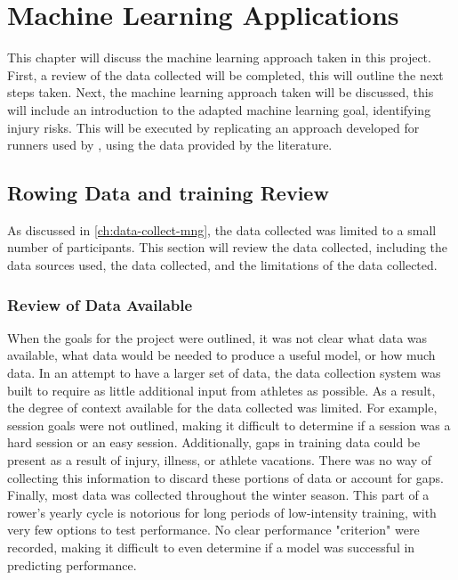 \chapter{\label{ch:ml}Machine Learning Applications}
This chapter will discuss the machine learning approach taken in this project. First, a review of the data collected will be completed, this will outline the next steps taken. Next, the machine learning approach taken will be discussed, this will include an introduction to the adapted machine learning goal, identifying injury risks. This will be executed by replicating an approach developed for runners used by \textcite{Lovdal2021}, using the data provided by the literature.

\section{Rowing Data and training Review}
As discussed in \autoref{ch:data-collect-mng}, the data collected was limited to a small number of participants. This section will review the data collected, including the data sources used, the data collected, and the limitations of the data collected.
\subsection{Review of Data Available}
When the goals for the project were outlined, it was not clear what data was available, what data would be needed to produce a useful model, or how much data. In an attempt to have a larger set of data, the data collection system was built to require as little additional input from athletes as possible. As a result, the degree of context available for the data collected was limited. For example, session goals were not outlined, making it difficult to determine if a session was a hard session or an easy session. Additionally, gaps in training data could be present as a result of injury, illness, or athlete vacations. There was no way of collecting this information to discard these portions of data or account for gaps. Finally, most data was collected throughout the winter season. This part of a rower's yearly cycle is notorious for long periods of low-intensity training, with very few options to test performance. No clear performance "criterion" were recorded, making it difficult to even determine if a model was successful in predicting performance.

